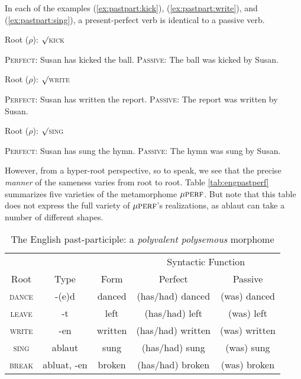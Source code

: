 In each of the examples (\ref{ex:pastpart:kick}), (\ref{ex:pastpart:write}), and (\ref{ex:pastpart:sing}), a present-perfect verb is identical to 
a passive verb.
\begin{exe}
\label{ex:pastpart}
	\ex Root ($\rho$): $\surd$\textsc{kick}
		\begin{xlist} \label{ex:pastpart:kick}
		\ex \textsc{Perfect:} Susan has kicked the ball. \label{ex:pastpart:kick:perf}
		\ex \textsc{Passive:} The ball was kicked by Susan.\label{ex:pastpart:kick:pass}
		\end{xlist}
	\ex Root ($\rho$): $\surd$\textsc{write}
		\begin{xlist} \label{ex:pastpart:write}
		\ex \textsc{Perfect:} Susan has written the report. \label{ex:pastpart:write:perf}
		\ex \textsc{Passive:} The report was written by Susan. \label{ex:pastpart:write:pass}
		\end{xlist}
	\ex Root ($\rho$): $\surd$\textsc{sing}
		\begin{xlist} \label{ex:pastpart:sing}
		\ex \textsc{Perfect:} Susan has sung the hymn. \label{ex:pastpart:sing:perf}
		\ex \textsc{Passive:} The hymn was sung by Susan. \label{ex:pastpart:sing:pass}
		\end{xlist}
\end{exe}
However,
from a hyper-root perspective, so to speak, we see that the precise \emph{manner} of the sameness varies from root to root.  
Table \ref{tab:engpastperf} summarizes five varieties of the metamorphome $\mu{\textsc{perf}}$. But note that this table
does not express the full variety of $\mu{\textsc{perf}}$'s realizations, as ablaut can take a number of different shapes.
\begin{table}[ht]
\centering %
\begin{tabular}{c c c c c} %
\hline
& & & \multicolumn{2}{c}{Syntactic Function} \\[-1ex] 
Root & Type & Form & Perfect & Passive  \\ [0.5ex] %
\hline
\textsc{dance} & -(e)d & danced & (has/had) danced & (was) danced \\
\textsc{leave} & -t & left & (has/had) left & (was) left \\ 
\textsc{write} & -en & written & (has/had) written & (was) written \\
\textsc{sing} & ablaut & sung & (has/had) sung & (was) sung \\
\textsc{break} & abluat, -en & broken & (has/had) broken & (was) broken \\
\hline 
\end{tabular}
\label{tab:engpastpart} %
\caption{The English past-participle: a \emph{polyvalent polysemous} morphome} %
\end{table}

